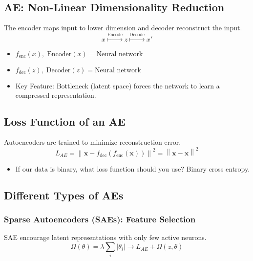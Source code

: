 \subsection{AE: Non-Linear Dimensionality Reduction}
\begin{definition}
    The encoder maps input to lower dimension and decoder reconstruct the input.
    \[
    x \overset{\text{Encode}}{\mapsto} z \overset{\text{Decode}}{\mapsto} x'
    \]
    \begin{itemize}
        \item $f_{\text{enc}}(x), \; \text{Encoder}(x) = \text{Neural network}$
        \item $f_{\text{dec}}(z), \; \text{Decoder}(z) = \text{Neural network}$ 
        \item Key Feature: Bottleneck (latent space) forces the network to learn a compressed representation.
    \end{itemize}
\end{definition}

\subsection{Loss Function of an AE}
\begin{definition}
    Autoencoders are trained to minimize reconstruction error.
    \[
    L_{AE} = \left\| \mathbf{x} - f_{\text{dec}}(f_{\text{enc}}(\mathbf{x})) \right\|^2 = \left\| \mathbf{x} - \hat{\mathbf{x}} \right\|^2
    \]
\end{definition}

\begin{notes}
    \begin{itemize}
        \item If our data is binary, what loss function should you use? Binary cross entropy.
    \end{itemize}
\end{notes}

\subsection{Different Types of AEs}

\subsubsection{Sparse Autoencoders (SAEs): Feature Selection}
\begin{definition}
    SAE encourage latent representations with only few active neurons. 
    \begin{equation}
        \Omega(\theta) = \lambda \sum_i \left| \theta_i \right| \rightarrow L_{AE} + \Omega(z, \theta)
    \end{equation}
\end{definition}

